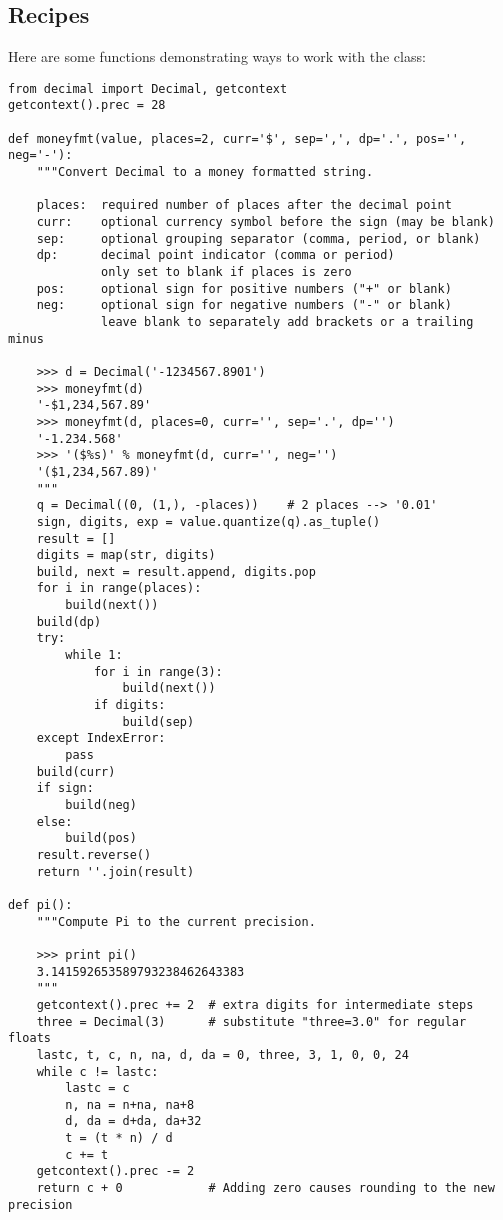 \subsection{Recipes \label{decimal-recipes}}

Here are some functions demonstrating ways to work with the
 class:

\begin{verbatim}
from decimal import Decimal, getcontext
getcontext().prec = 28

def moneyfmt(value, places=2, curr='$', sep=',', dp='.', pos='', neg='-'):
    """Convert Decimal to a money formatted string.

    places:  required number of places after the decimal point
    curr:    optional currency symbol before the sign (may be blank)
    sep:     optional grouping separator (comma, period, or blank)
    dp:      decimal point indicator (comma or period)
             only set to blank if places is zero
    pos:     optional sign for positive numbers ("+" or blank)
    neg:     optional sign for negative numbers ("-" or blank)
             leave blank to separately add brackets or a trailing minus

    >>> d = Decimal('-1234567.8901')
    >>> moneyfmt(d)
    '-$1,234,567.89'
    >>> moneyfmt(d, places=0, curr='', sep='.', dp='')
    '-1.234.568'
    >>> '($%s)' % moneyfmt(d, curr='', neg='')
    '($1,234,567.89)'
    """
    q = Decimal((0, (1,), -places))    # 2 places --> '0.01'
    sign, digits, exp = value.quantize(q).as_tuple()
    result = []
    digits = map(str, digits)
    build, next = result.append, digits.pop    
    for i in range(places):
        build(next())
    build(dp)
    try:
        while 1:
            for i in range(3):
                build(next())
            if digits:
                build(sep)
    except IndexError:
        pass
    build(curr)
    if sign:
        build(neg)
    else:
        build(pos)
    result.reverse()
    return ''.join(result)

def pi():
    """Compute Pi to the current precision.

    >>> print pi()
    3.141592653589793238462643383
    """
    getcontext().prec += 2  # extra digits for intermediate steps
    three = Decimal(3)      # substitute "three=3.0" for regular floats
    lastc, t, c, n, na, d, da = 0, three, 3, 1, 0, 0, 24
    while c != lastc:
        lastc = c
        n, na = n+na, na+8
        d, da = d+da, da+32
        t = (t * n) / d
        c += t
    getcontext().prec -= 2
    return c + 0            # Adding zero causes rounding to the new precision


\end{verbatim}
